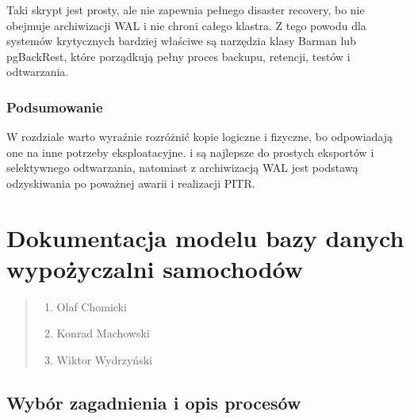 \documentclass[a4paper,11pt,english,openany,oneside]{sphinxmanual}
\begin{document}
\sphinxAtStartPar
Taki skrypt jest prosty, ale nie zapewnia pełnego disaster recovery, bo nie obejmuje archiwizacji WAL i nie chroni całego klastra. Z tego powodu dla systemów krytycznych bardziej właściwe są narzędzia klasy Barman lub pgBackRest, które porządkują pełny proces backupu, retencji, testów i odtwarzania.


\subsection{Podsumowanie}
\label{\detokenize{rozdzial_2/rozdzial_28/index:podsumowanie}}
\sphinxAtStartPar
W rozdziale warto wyraźnie rozróżnić kopie logiczne i fizyczne, bo odpowiadają one na inne potrzeby eksploatacyjne.  i  są najlepsze do prostych eksportów i selektywnego odtwarzania, natomiast  z archiwizacją WAL jest podstawą odzyskiwania po poważnej awarii i realizacji PITR.

\sphinxstepscope


\chapter{Dokumentacja modelu bazy danych wypożyczalni samochodów}
\label{\detokenize{rozdzial_3/index:dokumentacja-modelu-bazy-danych-wypozyczalni-samochodow}}\label{\detokenize{rozdzial_3/index::doc}}\begin{quote}\begin{description}
\begin{enumerate}
%
\item {} 
\sphinxAtStartPar
Olaf Chomicki

\item {} 
\sphinxAtStartPar
Konrad Machowski

\item {} 
\sphinxAtStartPar
Wiktor Wydrzyński

\end{enumerate}

\end{description}\end{quote}


\section{Wybór zagadnienia i opis procesów}
\label{\detokenize{rozdzial_3/index:wybor-zagadnienia-i-opis-procesow}}
\end{document}
